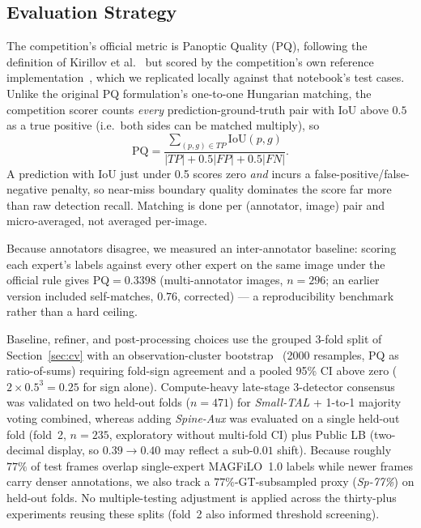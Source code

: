 \documentclass[sigconf]{acmart}
\begin{document}
\subsection{Evaluation Strategy}\label{sec:evaluation-strategy}
    The competition's official metric is Panoptic Quality (PQ), following the definition of Kirillov et al.~\cite{kirillov2019panoptic} but scored by the competition's own reference implementation~\cite{selfeval2026}, which we replicated locally against that notebook's test cases. Unlike the original PQ formulation's one-to-one Hungarian matching, the competition scorer counts \emph{every} prediction-ground-truth pair with IoU above $0.5$ as a true positive (i.e.\ both sides can be matched multiply), so
    \[
        \mathrm{PQ} = \frac{\sum_{(p,g)\in TP}\mathrm{IoU}(p,g)}{|TP| + 0.5|FP| + 0.5|FN|}.
    \]
    A prediction with IoU just under 0.5 scores zero \emph{and} incurs a false-positive/false-negative penalty, so near-miss boundary quality dominates the score far more than raw detection recall. Matching is done per (annotator, image) pair and micro-averaged, not averaged per-image.

    Because annotators disagree, we measured an inter-annotator baseline: scoring each expert's labels against every other expert on the same image under the official rule gives PQ$=0.3398$ (multi-annotator images, $n{=}296$; an earlier version included self-matches, $0.76$, corrected) --- a reproducibility benchmark rather than a hard ceiling.

    Baseline, refiner, and post-processing choices use the grouped 3-fold split of Section~\ref{sec:cv} with an observation-cluster bootstrap~\cite{efron1993bootstrap} (2000 resamples, PQ as ratio-of-sums) requiring fold-sign agreement and a pooled 95\% CI above zero ($2\times 0.5^3 = \allowbreak 0.25$ for sign alone). Compute-heavy late-stage 3-detector consensus was validated on two held-out folds ($n{=}471$) for \emph{Small-TAL} + 1-to-1 majority voting combined, whereas adding \emph{Spine-Aux} was evaluated on a single held-out fold (fold~2, $n{=}235$, exploratory without multi-fold CI) plus Public LB (two-decimal display, so $0.39{\rightarrow}0.40$ may reflect a sub-$0.01$ shift). Because roughly $77\%$ of test frames overlap single-expert MAGFiLO~1.0 labels while newer frames carry denser annotations, we also track a $77\%$-GT-subsampled proxy (\emph{Sp-77\%}) on held-out folds. No multiple-testing adjustment is applied across the thirty-plus experiments reusing these splits (fold~2 also informed threshold screening).
\end{document}
